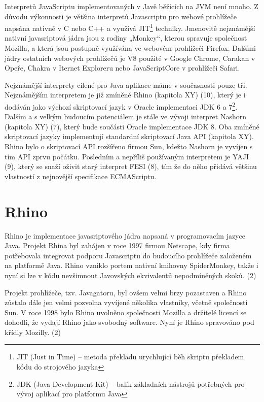 Interpretů JavaScriptu implementovaných v Javě běžících na JVM není mnoho. Z důvodu výkonnosti je většina interpretů Javascriptu pro webové prohlížeče napsána nativně v C nebo C++ a využívá JIT\footnote{JIT (Just in Time) -- metoda překladu urychlující běh skriptu překladem kódu do strojového jazyka} techniky. Jmenovitě nejznámější nativní javasriptová jádra jsou z rodiny „Monkey“, kterou spravuje společnost Mozilla, a která jsou postupně využívána ve webovém prohlížeči Firefox. Dalšími jádry ostatních webových prohlížečů je V8 použité v Google Chrome, Carakan v Opeře, Chakra v Iternet Exploreru nebo JavaScriptCore v prohlížeči Safari.

Nejznámější interprety cílené pro Java aplikace máme v současnosti pouze tři. Nejznámějším interpretem je již zmíněné Rhino (kapitola XY) (10), který je i dodáván jako výchozí skriptovací jazyk v Oracle implementaci JDK 6 a 7\footnote{JDK (Java Development Kit) -- balík základních nástrojů potřebných pro vývoj aplikací pro platformu Java}. Dalším a s velkým budoucím potenciálem je stále ve vývoji interpret Nashorn (kapitola XY) (7), který bude součásti Oracle implementace JDK 8. Oba zmíněné skriptovací jazyky implementují standardní skriptovací Java API (kapitola XY). Rhino bylo o skriptovací API rozšířeno firmou Sun, kdežto Nashorn je vyvíjen s tím API zprvu počátku. Posledním a nepříliš používaným interpretem je YAJI (9), který se snaží oživit starý interpret FESI (8), tím že do něho přidává většinu vlastností z nejnovější specifikace ECMAScriptu.

\section{Rhino}
\label{Chapter.JavaScriptInJavaAnalysis.Rhino}

Rhino je implementace javasriptového jádra napsaná v programovacím jazyce Java. Projekt Rhina byl zahájen v roce 1997 firmou Netscape, kdy firma potřebovala integrovat podporu Javascriptu do budoucího prohlížeče založeném na platformě Java. Rhino vzniklo portem nativní knihovny SpiderMonkey, takže i nyní si lze v kódu nevšimnout Javovských ekvivalentů nepodmíněných skoků. (2)

Projekt prohlížeče, tzv. Javagatoru, byl ovšem velmi brzy pozastaven a Rhino zůstalo dále jen velmi pozvolna vyvíjené několika vlastníky, včetně společnosti Sun. V roce 1998 bylo Rhino uvolněno společnosti Mozilla a držitelé licencí se dohodli, že vydají Rhino jako svobodný software. Nyní je Rhino spravováno pod křídly Mozilly. (2)

